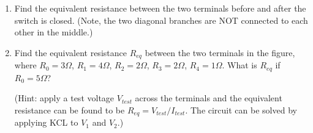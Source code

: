 \begin{enumerate}
%










\item Find the equivalent resistance between the two terminals before and
after the switch is closed. (Note, the two diagonal branches are NOT
connected to each other in the middle.)


\item Find the equivalent resistance $R_{eq}$ between the two terminals
in the figure, where $R_0=3\Omega$, $R_1=4\Omega$, $R_2=2\Omega$, $R_3=2\Omega$, 
$R_4=1\Omega$. What is $R_{eq}$ if $R_0=5\Omega$?

(Hint: apply a test voltage $V_{test}$ across the terminals and the 
equivalent resistance can be found to be $R_{eq}=V_{test}/I_{test}$.
The circuit can be solved by applying KCL to $V_1$ and $V_2$.)


\end{enumerate}
